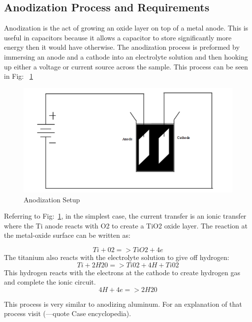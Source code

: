 \documentclass[journal]{IEEEtran}
\begin{document}
\subsection{Anodization Process and Requirements}

Anodization is the act of growing an oxide layer on top of a metal anode. This is useful in capacitors because it allows a capacitor to store significantly more energy then it would have otherwise. The anodization process is preformed by immersing an anode and a cathode into an electrolyte solution and then hooking up either a voltage or current source across the sample. This process can be seen in Fig:  ~\ref{fig:anodSetup}

\begin{figure}[here]
\centering
\includegraphics{anodSetup}
\caption{Anodization Setup}
\label{fig:anodSetup}
\end{figure}


Referring to Fig:~\ref{fig:anodSetup}, in the simplest case, the current transfer is an ionic transfer where the Ti anode reacts with O2 to create a TiO2 oxide layer. The reaction at the metal-oxide surface can be written as:

\begin{equation}
Ti + 02 => TiO2 + 4e
\end{equation}
The titanium also reacts with the electrolyte solution to give off hydrogen:
\begin{equation}
Ti + 2H20 => Ti02 + 4H+Ti02
\end{equation}
This hydrogen reacts with the electrons at the cathode to create hydrogen gas and complete the ionic circuit.
\begin{equation}
4H + 4e => 2H20
\end{equation}

This process is very similar to anodizing aluminum. For an explanation of that process visit (---quote Case encyclopedia). 
\end{document}
